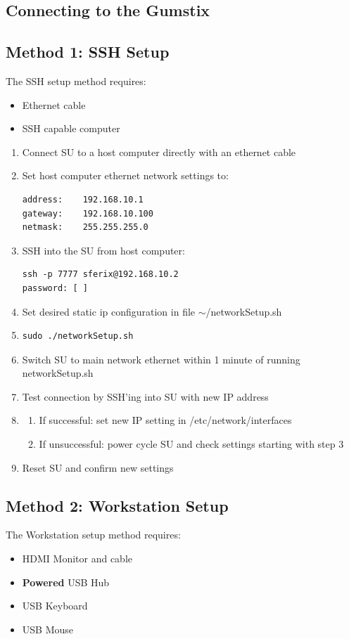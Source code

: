 \documentclass[12pt, letterpaper, onecolumn, oneside]{article}
\begin{document}
\subsection{Connecting to the Gumstix}
\label{app:appendix:setup}

\subsection*{Method 1: SSH Setup}
The SSH setup method requires:
\begin{itemize}
\item{Ethernet cable}
\item{SSH capable computer}
\end{itemize}

\begin{enumerate}
\item{Connect SU to a host computer directly with an ethernet cable}
\item{Set host computer ethernet network settings to:
\begin{verbatim}
address:	192.168.10.1
gateway:	192.168.10.100
netmask:	255.255.255.0
\end{verbatim}}
\item{SSH into the SU from host computer:
\begin{verbatim}
ssh -p 7777 sferix@192.168.10.2
password: [	]
\end{verbatim}}
\item{Set desired static ip configuration in file $\sim$/networkSetup.sh}
\item{\begin{verbatim}
sudo ./networkSetup.sh
\end{verbatim}}
\item{Switch SU to main network ethernet within 1 minute of running networkSetup.sh}
\item{Test connection by SSH'ing into SU with new IP address}
\item{
\begin{enumerate}
\item{If successful: set new IP setting in /etc/network/interfaces}
\item{If unsuccessful: power cycle SU and check settings starting with step 3}
\end{enumerate}}
\item{Reset SU and confirm new settings}
\end{enumerate}

\subsection*{Method 2: Workstation Setup}
The Workstation setup method requires:
\begin{itemize}
\item{HDMI Monitor and cable}
\item{{\bf Powered} USB Hub}
\item{USB Keyboard}
\item{USB Mouse}
\end{itemize}
\end{document}

